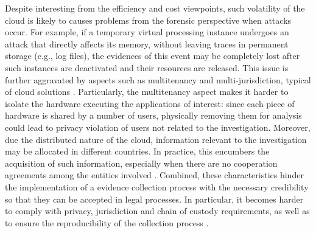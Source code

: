 \documentclass[conference]{IEEEtran}
\begin{document}
%
Despite interesting from the efficiency and cost viewpoints, such volatility of the cloud is likely to causes problems from the forensic perspective when attacks occur.
%
For example, if a temporary virtual processing instance undergoes an attack that directly affects its memory, without leaving traces in permanent storage (e.g., log files), the evidences of this event may be completely lost after such instances are deactivated and their resources are released.
%
This issue is further aggravated by aspects such as multitenancy and multi-jurisdiction, typical of cloud solutions \cite{Bash_Adv_in_Forensics:2015}.
%
Particularly, the multitenancy aspect makes it harder to isolate the hardware executing the applications of interest: since each piece of hardware is shared by a number of users, physically removing them for analysis could lead to privacy violation of users not related to the investigation. 
%
Moreover, due the distributed nature of the cloud, information relevant to the investigation may be allocated in different countries.
%
In practice, this encumbers the acquisition of such information, especially when there are no cooperation agreements among the entities involved \cite{Dykstra_Acquiring_for_IAAS:2012}.
%
%
Combined, these characteristics hinder the implementation of a evidence collection process with the necessary credibility so that they can be accepted in legal processes.
%
In particular, it becomes harder to comply with privacy, jurisdiction and chain of custody requirements, as well as to ensure the reproducibility of the collection process \cite{Rahman_Live_Forensics_Techniques:2015}.
\end{document}
